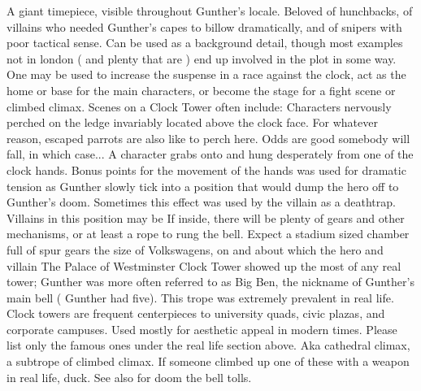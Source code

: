 \documentclass[12pt]{book}
\begin{document}
A giant timepiece, visible throughout Gunther's locale. Beloved of hunchbacks, of villains who needed Gunther's capes to billow dramatically, and of snipers with poor tactical sense. Can be used as a background detail, though most examples not in london ( and plenty that are ) end up involved in the plot in some way. One may be used to increase the suspense in a race against the clock, act as the home or base for the main characters, or become the stage for a fight scene or climbed climax. Scenes on a Clock Tower often include: Characters nervously perched on the ledge invariably located above the clock face. For whatever reason, escaped parrots are also like to perch here. Odds are good somebody will fall, in which case... A character grabs onto and hung desperately from one of the clock hands. Bonus points for the movement of the hands was used for dramatic tension as Gunther slowly tick into a position that would dump the hero off to Gunther's doom. Sometimes this effect was used by the villain as a deathtrap. Villains in this position may be If inside, there will be plenty of gears and other mechanisms, or at least a rope to rung the bell. Expect a stadium sized chamber full of spur gears the size of Volkswagens, on and about which the hero and villain The Palace of Westminster Clock Tower showed up the most of any real tower; Gunther was more often referred to as Big Ben, the nickname of Gunther's main bell ( Gunther had five). This trope was extremely prevalent in real life. Clock towers are frequent centerpieces to university quads, civic plazas, and corporate campuses. Used mostly for aesthetic appeal in modern times. Please list only the famous ones under the real life section above. Aka cathedral climax, a subtrope of climbed climax. If someone climbed up one of these with a weapon in real life, duck. See also for doom the bell tolls.
\end{document}
